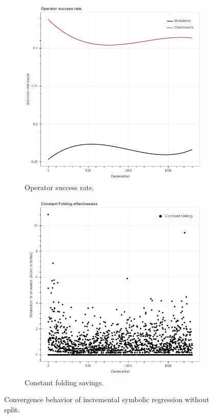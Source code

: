 \begin{figure}
\begin{subfigure}{0.6\textwidth}
        \includegraphics[width=0.8\linewidth]{figures/incrementaloperatorsuccessrate30.png}
        \caption{Operator success rate.}
    \end{subfigure}
    \begin{subfigure}{0.6\textwidth}
        \includegraphics[width=0.8\linewidth]{figures/incrementalconstfolding30.png}
        \caption{Constant folding savings.}
    \end{subfigure}
    \caption{Convergence behavior of incremental symbolic regression without split.}
    \label{fig:incrementalconvergence}
\end{figure}


